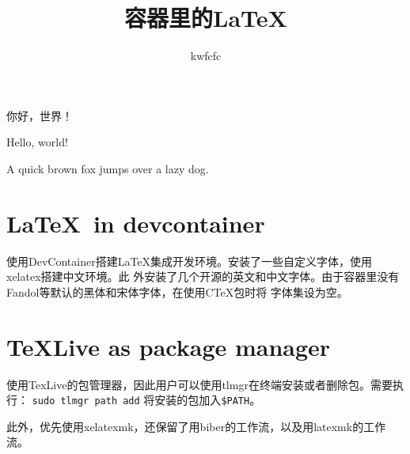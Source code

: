 \documentclass[UTF8]{article}
\author{kwfcfc}
\date{}
\title{容器里的\LaTeX }
\begin{document}
\maketitle

你好，世界！

Hello, world!

A quick brown fox jumps over a lazy dog.

\section{\LaTeX~in devcontainer}

使用DevContainer搭建\LaTeX 集成开发环境。安装了一些自定义字体，使用xelatex搭建中文环境。此
外安装了几个开源的英文和中文字体。由于容器里没有Fandol等默认的黑体和宋体字体，在使用CTeX包时将
字体集设为空。

\section{TeXLive as package manager}

使用TexLive的包管理器，因此用户可以使用tlmgr在终端安装或者删除包。需要执行：
\texttt{sudo tlmgr path add}
将安装的包加入\texttt{\$PATH}。

此外，优先使用xelatexmk，还保留了用biber的工作流，以及用latexmk的工作流。
\end{document}
